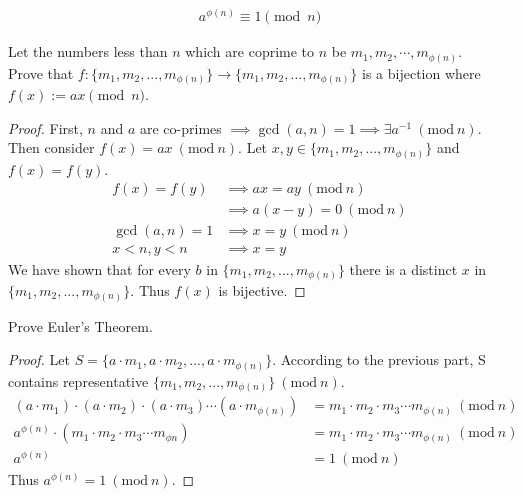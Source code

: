 \documentclass[11pt]{article}
\newcommand{\Mod}[1]{\ (\mathrm{mod}\ #1)}
\begin{document}
\newpage
{}

\begin{align*}
    a^{\phi(n)} \equiv 1 \pmod{n}
\end{align*}

\begin{Parts}
    \Part Let the numbers less than $n$ which are coprime to $n$ be $m_1, m_2, \cdots, m_{\phi(n)}$. \\
          Prove that $f:\{m_1, m_2, ..., m_{\phi(n)}\} \to \{m_1, m_2, ..., m_{\phi(n)}\}$ is a bijection where $f(x) := ax \pmod{n}$.
    \begin{Answer}
        \begin{proof}
            First, $n$ and $a$ are co-primes $\implies \gcd(a,n)=1 \implies \exists a^{-1} \Mod{n}$. \\
            Then consider $f(x) = ax \Mod{n}$. Let $x,y \in \{m_1, m_2, ..., m_{\phi(n)}\}$ and $f(x)=f(y)$. 
            \begin{align*}
                f(x) = f(y)   &\implies ax = ay \Mod{n} \\ 
                            &\implies a(x - y) = 0 \Mod{n} \\
                \gcd(a,n) = 1 &\implies x = y \Mod{n} \\
                x < n, y < n  &\implies x = y 
            \end{align*}
            We have shown that for every $b$ in $\{m_1, m_2, ..., m_{\phi(n)}\}$ there is a distinct $x$ in $\{m_1, m_2, ..., m_{\phi(n)}\}$. Thus $f(x)$ is bijective.  
        \end{proof}
    \end{Answer}

    \Part Prove Euler's Theorem. 
    \begin{Answer}
        \begin{proof}
            Let $S = \{a \cdot m_1, a \cdot m_2, ..., a \cdot m_{\phi(n)}\}$. According to the previous part, S contains representative $\{m_1, m_2, ..., m_{\phi(n)}\} \Mod{n}$. 
            \begin{align*}
                (a \cdot m_1) \cdot (a \cdot m_2) \cdot (a \cdot m_3) \cdots (a \cdot m_{\phi(n)}) &= m_1 \cdot m_2 \cdot m_3 \cdots m_{\phi(n)} \Mod{n} \\
                                       a^{\phi(n)} \cdot (m_1\cdot m_2\cdot m_3\cdots m_{\phi{n}}) &= m_1 \cdot m_2 \cdot m_3 \cdots m_{\phi(n)} \Mod{n} \\
                                                                                       a^{\phi(n)} &= 1 \Mod{n}
            \end{align*}
            Thus $a^{\phi(n)} = 1 \Mod{n}$. 
        \end{proof}
    \end{Answer}
\end{Parts}
\end{document}
